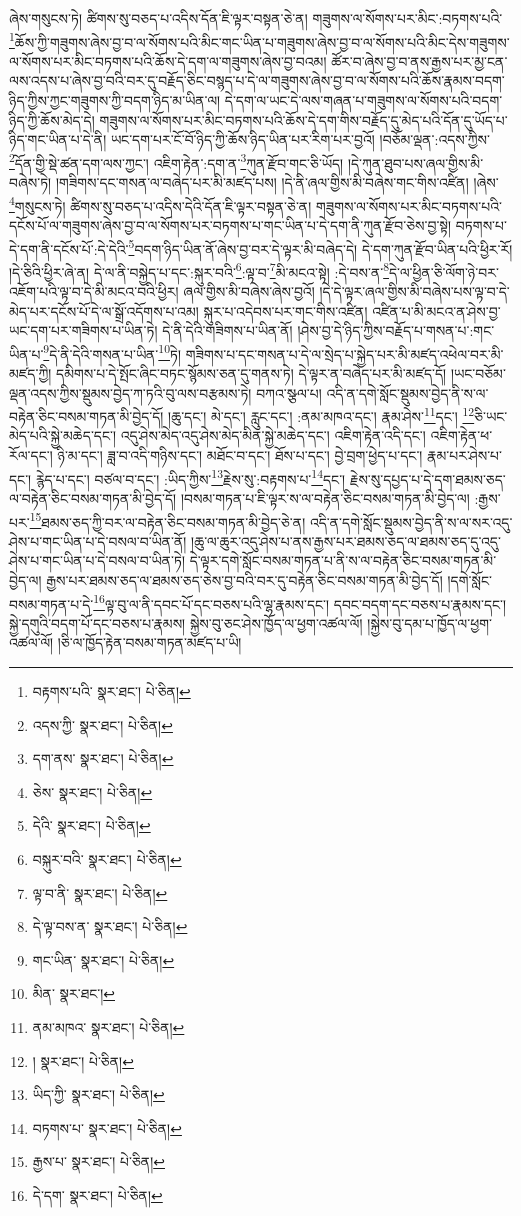 ཞེས་གསུངས་ཏེ། ཚིགས་སུ་བཅད་པ་འདིས་དོན་ཇི་ལྟར་བསྟན་ཅེ་ན། གཟུགས་ལ་སོགས་པར་མིང་:བཏགས་པའི་\footnote{བརྟགས་པའི་  སྣར་ཐང་།  པེ་ཅིན། }ཆོས་ཀྱི་གཟུགས་ཞེས་བྱ་བ་ལ་སོགས་པའི་མིང་གང་ཡིན་པ་གཟུགས་ཞེས་བྱ་བ་ལ་སོགས་པའི་མིང་དེས་གཟུགས་ལ་སོགས་པར་མིང་བཏགས་པའི་ཆོས་དེ་དག་ལ་གཟུགས་ཞེས་བྱ་བའམ། ཚོར་བ་ཞེས་བྱ་བ་ནས་རྒྱས་པར་མྱ་ངན་ལས་འདས་པ་ཞེས་བྱ་བའི་བར་དུ་བརྗོད་ཅིང་བསྙད་པ་དེ་ལ་གཟུགས་ཞེས་བྱ་བ་ལ་སོགས་པའི་ཆོས་རྣམས་བདག་ཉིད་ཀྱིས་ཀྱང་གཟུགས་ཀྱི་བདག་ཉིད་མ་ཡིན་ལ། དེ་དག་ལ་ཡང་དེ་ལས་གཞན་པ་གཟུགས་ལ་སོགས་པའི་བདག་ཉིད་ཀྱི་ཆོས་མེད་དེ། གཟུགས་ལ་སོགས་པར་མིང་བཏགས་པའི་ཆོས་དེ་དག་གིས་བརྗོད་དུ་མེད་པའི་དོན་དུ་ཡོད་པ་ཉིད་གང་ཡིན་པ་དེ་ནི། ཡང་དག་པར་ངོ་བོ་ཉིད་ཀྱི་ཆོས་ཉིད་ཡིན་པར་རིག་པར་བྱའོ། །བཅོམ་ལྡན་:འདས་ཀྱིས་\footnote{འདས་ཀྱི་  སྣར་ཐང་།  པེ་ཅིན། }དོན་གྱི་སྡེ་ཚན་དག་ལས་ཀྱང་། འཇིག་རྟེན་:དག་ན་\footnote{དག་ནས་  སྣར་ཐང་།  པེ་ཅིན། }ཀུན་རྫོབ་གང་ཅི་ཡོད། །དེ་ཀུན་ཐུབ་པས་ཞལ་གྱིས་མི་བཞེས་ཏེ། །གཟིགས་དང་གསན་ལ་བཞེད་པར་མི་མཛད་པས། །དེ་ནི་ཞལ་གྱིས་མི་བཞེས་གང་གིས་འཛིན། །ཞེས་\footnote{ཅེས་  སྣར་ཐང་།  པེ་ཅིན། }གསུངས་ཏེ། ཚིགས་སུ་བཅད་པ་འདིས་དེའི་དོན་ཇི་ལྟར་བསྟན་ཅེ་ན། གཟུགས་ལ་སོགས་པར་མིང་བཏགས་པའི་དངོས་པོ་ལ་གཟུགས་ཞེས་བྱ་བ་ལ་སོགས་པར་བཏགས་པ་གང་ཡིན་པ་དེ་དག་ནི་ཀུན་རྫོབ་ཅེས་བྱ་སྟེ། བཏགས་པ་དེ་དག་ནི་དངོས་པོ་:དེ་དེའི་\footnote{དེའི་  སྣར་ཐང་།  པེ་ཅིན། }བདག་ཉིད་ཡིན་ནོ་ཞེས་བྱ་བར་དེ་ལྟར་མི་བཞེད་དེ། དེ་དག་ཀུན་རྫོབ་ཡིན་པའི་ཕྱིར་རོ། །དེ་ཅིའི་ཕྱིར་ཞེ་ན། དེ་ལ་ནི་བསྐྱེད་པ་དང་:སྐུར་བའི་\footnote{བསྐུར་བའི་  སྣར་ཐང་།  པེ་ཅིན། }:ལྟ་བ་\footnote{ལྟ་བ་ནི་  སྣར་ཐང་།  པེ་ཅིན། }མི་མངའ་སྟེ། :དེ་བས་ན་\footnote{དེ་ལྟ་བས་ན་  སྣར་ཐང་།  པེ་ཅིན། }དེ་ལ་ཕྱིན་ཅི་ལོག་ཉེ་བར་འཇོག་པའི་ལྟ་བ་དེ་མི་མངའ་བའི་ཕྱིར། ཞལ་གྱིས་མི་བཞེས་ཞེས་བྱའོ། །དེ་དེ་ལྟར་ཞལ་གྱིས་མི་བཞེས་པས་ལྟ་བ་དེ་མེད་པར་དངོས་པོ་དེ་ལ་སྒྲོ་འདོགས་པ་འམ། སྐུར་པ་འདེབས་པར་གང་གིས་འཛིན། འཛིན་པ་མི་མངའ་ན་ཤེས་བྱ་ཡང་དག་པར་གཟིགས་པ་ཡིན་ཏེ། དེ་ནི་དེའི་གཟིགས་པ་ཡིན་ནོ། །ཤེས་བྱ་དེ་ཉིད་ཀྱིས་བརྗོད་པ་གསན་པ་:གང་ཡིན་པ་\footnote{གང་ཡིན་  སྣར་ཐང་།  པེ་ཅིན། }དེ་ནི་དེའི་གསན་པ་ཡིན་\footnote{མིན་  སྣར་ཐང་། }ཏེ། གཟིགས་པ་དང་གསན་པ་དེ་ལ་སྲེད་པ་སྐྱེད་པར་མི་མཛད་འཕེལ་བར་མི་མཛད་ཀྱི། དམིགས་པ་དེ་སྤོང་ཞིང་བཏང་སྙོམས་ཅན་དུ་གནས་ཏེ། དེ་ལྟར་ན་བཞེད་པར་མི་མཛད་དོ། །ཡང་བཅོམ་ལྡན་འདས་ཀྱིས་སྡུམས་བྱེད་ཀ་ཏའི་བུ་ལས་བརྩམས་ཏེ། བཀའ་སྩལ་པ། འདི་ན་དགེ་སློང་སྡུམས་བྱེད་ནི་ས་ལ་བརྟེན་ཅིང་བསམ་གཏན་མི་བྱེད་དོ། །ཆུ་དང་། མེ་དང་། རླུང་དང་། :ནམ་མཁའ་དང་། རྣམ་ཤེས་\footnote{ནམ་མཁའ་  སྣར་ཐང་།  པེ་ཅིན། }དང་། \footnote{།    སྣར་ཐང་།  པེ་ཅིན། }ཅི་ཡང་མེད་པའི་སྐྱེ་མཆེད་དང་། འདུ་ཤེས་མེད་འདུ་ཤེས་མེད་མིན་སྐྱེ་མཆེད་དང་། འཇིག་རྟེན་འདི་དང་། འཇིག་རྟེན་ཕ་རོལ་དང་། ཉི་མ་དང་། ཟླ་བ་འདི་གཉིས་དང་། མཐོང་བ་དང་། ཐོས་པ་དང་། བྱེ་བྲག་ཕྱེད་པ་དང་། རྣམ་པར་ཤེས་པ་དང་། རྙེད་པ་དང་། བཙལ་བ་དང་། :ཡིད་ཀྱིས་\footnote{ཡིད་ཀྱི་  སྣར་ཐང་།  པེ་ཅིན། }རྗེས་སུ་:བརྟགས་པ་\footnote{བཏགས་པ་  སྣར་ཐང་།  པེ་ཅིན། }དང་། རྗེས་སུ་དཔྱད་པ་དེ་དག་ཐམས་ཅད་ལ་བརྟེན་ཅིང་བསམ་གཏན་མི་བྱེད་དོ། །བསམ་གཏན་པ་ཇི་ལྟར་ས་ལ་བརྟེན་ཅིང་བསམ་གཏན་མི་བྱེད་ལ། :རྒྱས་པར་\footnote{རྒྱས་པ་  སྣར་ཐང་།  པེ་ཅིན། }ཐམས་ཅད་ཀྱི་བར་ལ་བརྟེན་ཅིང་བསམ་གཏན་མི་བྱེད་ཅེ་ན། འདི་ན་དགེ་སློང་སྡུམས་བྱེད་ནི་ས་ལ་སར་འདུ་ཤེས་པ་གང་ཡིན་པ་དེ་བསལ་བ་ཡིན་ནོ། །ཆུ་ལ་ཆུར་འདུ་ཤེས་པ་ནས་རྒྱས་པར་ཐམས་ཅད་ལ་ཐམས་ཅད་དུ་འདུ་ཤེས་པ་གང་ཡིན་པ་དེ་བསལ་བ་ཡིན་ཏེ། དེ་ལྟར་དགེ་སློང་བསམ་གཏན་པ་ནི་ས་ལ་བརྟེན་ཅིང་བསམ་གཏན་མི་བྱེད་ལ། རྒྱས་པར་ཐམས་ཅད་ལ་ཐམས་ཅད་ཅེས་བྱ་བའི་བར་དུ་བརྟེན་ཅིང་བསམ་གཏན་མི་བྱེད་དོ། །དགེ་སློང་བསམ་གཏན་པ་དེ་\footnote{དེ་དག་  སྣར་ཐང་།  པེ་ཅིན། }ལྟ་བུ་ལ་ནི་དབང་པོ་དང་བཅས་པའི་ལྷ་རྣམས་དང་། དབང་བདག་དང་བཅས་པ་རྣམས་དང་། སྐྱེ་དགུའི་བདག་པོ་དང་བཅས་པ་རྣམས། སྐྱེས་བུ་ཅང་ཤེས་ཁྱོད་ལ་ཕྱག་འཚལ་ལོ། །སྐྱེས་བུ་དམ་པ་ཁྱོད་ལ་ཕྱག་འཚལ་ལོ། །ཅི་ལ་ཁྱོད་རྟེན་བསམ་གཏན་མཛད་པ་ཡི། 